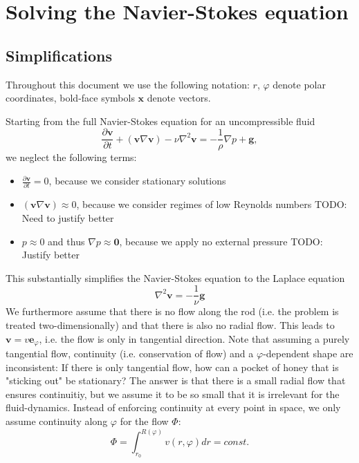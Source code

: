 \documentclass[11pt]{article}
\renewcommand{\vec}[1]{{\boldsymbol{#1}}}
\newcommand{\pdiff}[2]{{\frac{\partial {#1}}{\partial {#2}}}}
\newcommand{\commentms}[1]{{\color{red}#1}}
\begin{document}
    \section{Solving the Navier-Stokes equation}

    \subsection{Simplifications}
    Throughout this document we use the following notation: $r$, $\varphi$ denote polar coordinates, bold-face symbols $\vec{x}$ denote vectors.

    Starting from the full Navier-Stokes equation for an uncompressible fluid
    \begin{equation*}
    \pdiff{\vec{v}}{t} + (\vec{v} \nabla \vec{v}) - \nu \nabla^2 \vec{v} = -\frac{1}{\rho} \nabla p + \vec{g},
    \end{equation*}
    we neglect the following terms:
    \begin{itemize}
        \item $\pdiff{\vec{v}}{t} = 0$, because we consider stationary solutions
        \item $(\vec{v} \nabla \vec{v}) \approx 0$, because we consider regimes of low Reynolds numbers \commentms{TODO: Need to justify better}
        \item $p \approx 0$ and thus $\nabla p \approx \vec{0}$, because we apply no external pressure \commentms{TODO: Justify better}
    \end{itemize}
    This substantially simplifies the Navier-Stokes equation to the Laplace equation
    \begin{equation*}
        \nabla^2 \vec{v} = -\frac{1}{\nu} \vec{g}
    \end{equation*}
    We furthermore assume that there is no flow along the rod (i.e. the problem is treated two-dimensionally) and that there is also no radial flow.
    This leads to $\vec{v} = v \vec{e}_\varphi$, i.e. the flow is only in tangential direction.
    Note that assuming a purely tangential flow, continuity (i.e. conservation of flow) and a $\varphi$-dependent shape are inconsistent: If there is only tangential flow, how can a pocket of honey that is "sticking out" be stationary?
    The answer is that there is a small radial flow that ensures continuitiy, but we assume it to be so small that it is irrelevant for the fluid-dynamics.
    Instead of enforcing continuity at every point in space, we only assume continuity along $\varphi$ for the flow $\Phi$:
    \begin{equation*}
        \Phi = \int_{r_0}^{R(\varphi)} v(r, \varphi) dr = const.
    \end{equation*}
\end{document}

